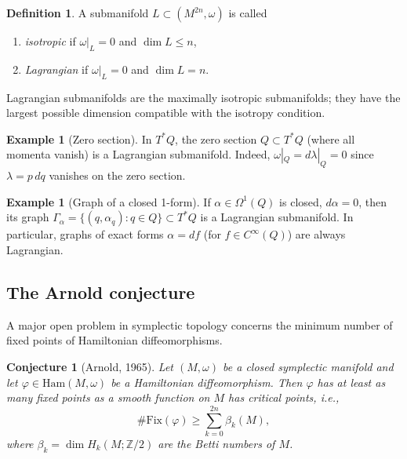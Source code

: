 \documentclass[12pt,a4paper]{amsart}
\newtheorem{conjecture}[theorem]{Conjecture}
\theoremstyle{definition}
\newtheorem{definition}[theorem]{Definition}
\newtheorem{example}[theorem]{Example}
\begin{document}
\begin{definition}
A submanifold $L \subset (M^{2n}, \omega)$ is called
\begin{enumerate}[label=(\roman*)]
  \item \emph{isotropic} if $\omega|_L = 0$ and $\dim L \leq n$,
  \item \emph{Lagrangian} if $\omega|_L = 0$ and $\dim L = n$.
\end{enumerate}
\end{definition}

Lagrangian submanifolds are the maximally isotropic submanifolds; they have
the largest possible dimension compatible with the isotropy condition.

\begin{example}[Zero section]
In $T^*Q$, the zero section $Q \subset T^*Q$ (where all momenta vanish) is
a Lagrangian submanifold.  Indeed, $\omega|_Q = d\lambda|_Q = 0$ since
$\lambda = p\,dq$ vanishes on the zero section.
\end{example}

\begin{example}[Graph of a closed 1-form]
If $\alpha \in \Omega^1(Q)$ is closed, $d\alpha = 0$, then its graph
$\Gamma_\alpha = \{(q, \alpha_q) : q \in Q\} \subset T^*Q$
is a Lagrangian submanifold.  In particular, graphs of exact forms $\alpha = df$
(for $f \in C^\infty(Q)$) are always Lagrangian.
\end{example}

\subsection{The Arnold conjecture}

A major open problem in symplectic topology concerns the minimum number of
fixed points of Hamiltonian diffeomorphisms.

\begin{conjecture}[Arnold, 1965]\label{conj:arnold}
Let $(M, \omega)$ be a closed symplectic manifold and let $\varphi \in
\mathrm{Ham}(M, \omega)$ be a Hamiltonian diffeomorphism.  Then $\varphi$
has at least as many fixed points as a smooth function on $M$ has critical
points, i.e.,
\[
  \#\mathrm{Fix}(\varphi) \geq \sum_{k=0}^{2n} \beta_k(M),
\]
where $\beta_k = \dim H_k(M; \mathbb{Z}/2)$ are the Betti numbers of $M$.
\end{conjecture}
\end{document}
